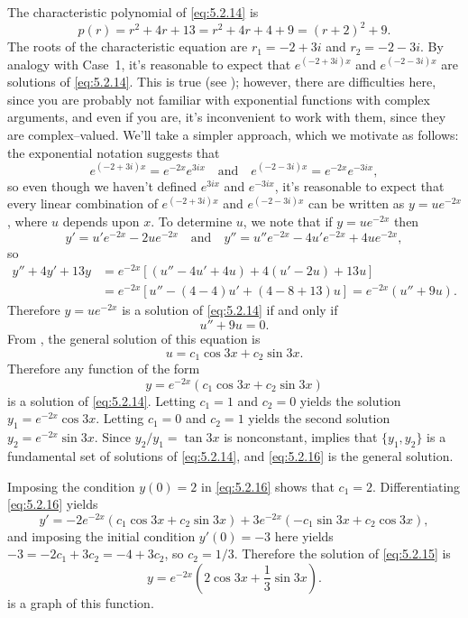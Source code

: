 \begin{alistSolution}
\item The characteristic
polynomial of
 \eqref{eq:5.2.14} is
\[
p(r)=r^2+4r+13=r^2+4r+4+9=(r+2)^2+9.
\]
The roots of the characteristic equation are $r_1=-2+3i$ and
$r_2=-2-3i$. By analogy with Case~1, it's reasonable to expect that
$e^{(-2+3i)x}$ and $e^{(-2-3i)x}$ are solutions of \eqref{eq:5.2.14}. This
is true (see );     however, there are
difficulties here, since you are probably not familiar with
exponential functions with complex arguments, and even if you are, it's
 inconvenient to work with them, since they are complex--valued. We'll
 take a simpler approach, which we motivate as follows: the
exponential notation suggests that
\[
e^{(-2+3i)x}=e^{-2x}e^{3ix}\quad\text{and}\quad
e^{(-2-3i)x}=e^{-2x}e^{-3ix},
\]
so even though we haven't defined $e^{3ix}$ and $e^{-3ix}$, it's
reasonable to expect that every linear
combination of $e^{(-2+3i)x}$ and $e^{(-2-3i)x}$ can be written as
$y=ue^{-2x}$, where $u$ depends upon $x$. To determine $u$, we note
that if $y=ue^{-2x}$ then
\[
y'=u'e^{-2x}-2ue^{-2x}\quad\text{and}\quad
y''=u''e^{-2x}-4u'e^{-2x}+4ue^{-2x},
\]
so
\begin{align*}
y''+4y'+13y&=e^{-2x}\left[(u''-4u'+4u)+4(u'-2u)+13u\right]\\
&=e^{-2x}\left[u''-(4-4)u'+(4-8+13)u\right]=e^{-2x}(u''+9u).
\end{align*}
Therefore $y=ue^{-2x}$ is a solution of \eqref{eq:5.2.14} if and only if
\[
u''+9u=0.
\]
From , the  general solution of this equation is
\[
u=c_1\cos 3x +c_2\sin 3x.
\]
 Therefore any function of the form
\begin{equation} \label{eq:5.2.16}
y=e^{-2x}(c_1\cos 3x+c_2\sin 3x)
\end{equation}
is  a solution of \eqref{eq:5.2.14}.
Letting $c_1=1$ and $c_2=0$  yields the solution
 $y_1=e^{-2x}\cos3x$. Letting $c_1=0$ and $c_2=1$
yields the second solution $y_2=e^{-2x}\sin3x$. Since
$y_2/y_1=\tan3x$
is nonconstant,  implies that   $\{y_1,y_2\}$ is
a fundamental set of solutions of \eqref{eq:5.2.14}, and \eqref{eq:5.2.16}
is the general solution.

\item Imposing the condition $y(0)=2$
in   \eqref{eq:5.2.16} shows that $c_1=2$.  Differentiating
\eqref{eq:5.2.16} yields
\[
y'=-2e^{-2x}(c_1\cos 3x+c_2\sin 3x) +3e^{-2x}(-c_1\sin 3x +c_2\cos 3x),
\]
and imposing the initial condition $y'(0)=-3$ here yields
$-3=-2c_1+3c_2=-4+3c_2$,
 so $c_2=1/3$. Therefore the solution of
\eqref{eq:5.2.15} is
\[
y=e^{-2x}(2\cos 3x+ \frac{1}{3}\sin 3x).
\]
  is a graph of this function.
\end{alistSolution}


